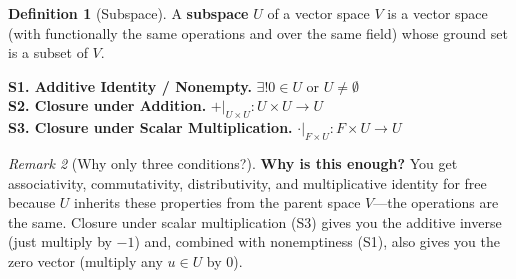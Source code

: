 \documentclass[11pt]{article}
\theoremstyle{definition}
\newtheorem{definition}{Definition}[section]
\theoremstyle{plain}
\theoremstyle{remark}
\newtheorem{remark}[definition]{Remark}
\begin{document}
\begin{definition}[Subspace]
A \textbf{subspace} $U$ of a vector space $V$ is a vector space (with functionally the same operations and over the same field) whose ground set is a subset of $V$.
\end{definition}

\begin{axiombox}
\textbf{S1. Additive Identity / Nonempty.} $\exists! 0 \in U$ or $U \neq \emptyset$ \\[4pt]
\textbf{S2. Closure under Addition.} $+\!\big|_{U \times U} : U \times U \to U$ \\[4pt]
\textbf{S3. Closure under Scalar Multiplication.} $\cdot\!\big|_{F \times U} : F \times U \to U$
\end{axiombox}

\begin{remark}[Why only three conditions?]
\textbf{Why is this enough?} You get associativity, commutativity, distributivity, and multiplicative identity for free because $U$ inherits these properties from the parent space $V$---the operations are the same. Closure under scalar multiplication (S3) gives you the additive inverse (just multiply by $-1$) and, combined with nonemptiness (S1), also gives you the zero vector (multiply any $u \in U$ by $0$).
\end{remark}
\end{document}
